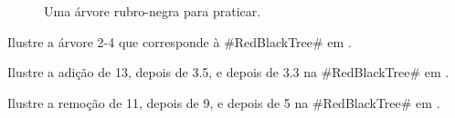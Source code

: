\begin{figure}
	\caption{Uma árvore rubro-negra para praticar.}
\end{figure}

\begin{exc}
	Ilustre a árvore 2-4 que corresponde à #RedBlackTree# em
	.
\end{exc}

\begin{exc}
	Ilustre a adição de 13, depois de 3.5, e depois de 3.3 na #RedBlackTree#
	em .
\end{exc}

\begin{exc}
	Ilustre a remoção de 11, depois de 9, e depois de 5 na #RedBlackTree# em
	.
\end{exc}

